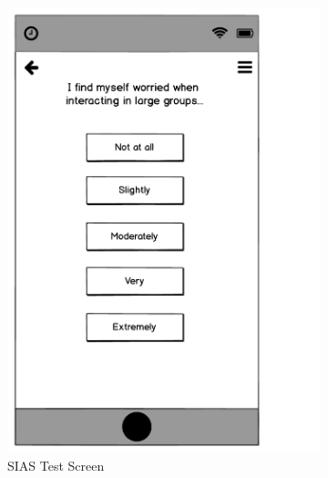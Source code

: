 \documentclass{l4proj}
\begin{document}
\begin{figure}[htbp]
\begin{subfigure}[b]{0.45\textwidth}
        \includegraphics[width=\textwidth]{images/iteration_1_test_screen_1.pdf}
        \caption{SIAS Test Screen}
        \label{fig:test_screen_1}
    \end{subfigure}
    \begin{subfigure}[b]{0.45\textwidth}

\end{subfigure}
\end{figure}
\end{document}

